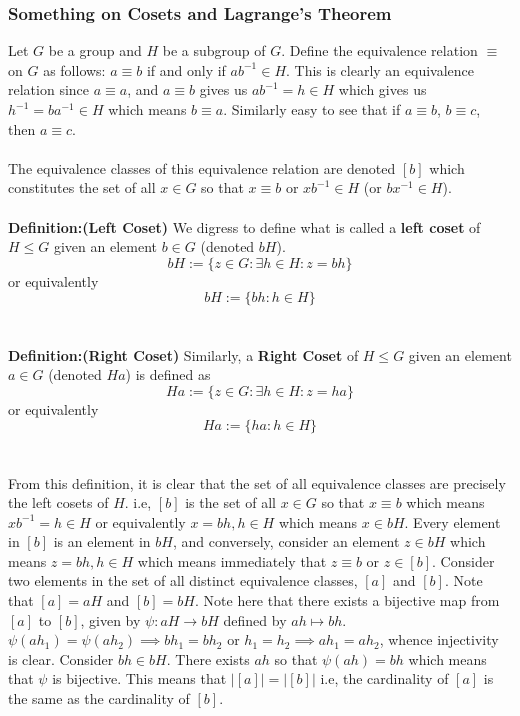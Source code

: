 \documentclass[../Main.tex]{subfiles}
\begin{document}

\subsubsection{Something on Cosets and Lagrange's Theorem}
Let $G$ be a group and $H$ be a subgroup of $G$. Define the equivalence relation $\equiv$ on $G$ as follows: $a \equiv b$ if and only if $ab^{-1} \in H$. This is clearly an equivalence relation since $a\equiv a$, and $a\equiv b$ gives us $ab^{-1}=h \in H$ which gives us $h^{-1}=ba^{-1}\in H$ which means $b\equiv a$. Similarly easy to see that if $a\equiv b$, $b\equiv c$, then $a\equiv c$. 
\\\\ The equivalence classes of this equivalence relation are denoted $[b]$ which constitutes the set of all $x \in G$ so that $x\equiv b$ or $xb^{-1}\in H$ (or $bx^{-1} \in H$). 
\\\\ \textbf{Definition:(Left Coset)} We digress to define what is called a \textbf{left coset} of $H\leq G$ given an element $b \in G$ (denoted $bH$). $$bH:=\{z\in G: \exists h \in H: z=bh\}$$ or equivalently $$bH:=\{bh:h\in H\}$$
\\\\ \textbf{Definition:(Right Coset)} Similarly, a \textbf{Right Coset} of $H \leq G$ given an element $a \in G$ (denoted $Ha$) is defined as $$Ha:=\{z \in G: \exists h \in H: z=ha\} $$ or equivalently $$Ha:=\{ha: h \in H\} $$
\\\\From this definition, it is clear that the set of all equivalence classes are precisely the left cosets of $H$. i.e, $[b]$ is the set of all $x \in G$ so that $x \equiv b$ which means $xb^{-1}=h\in H$ or equivalently $x=bh, h\in H$ which means $x \in bH$. Every element in $[b]$ is an element in $bH$, and conversely, consider an element $z \in bH$ which means $z=bh, h \in H$ which means immediately that $z \equiv b$ or $z \in [b]$. Consider two elements in the set of all distinct equivalence classes, $[a]$ and $[b]$. Note that $[a]=aH$ and $[b]=bH$. Note here that there exists a bijective map from $[a]$ to $[b]$, given by $\psi:aH \to bH$ defined by $ah \mapsto bh$. $\psi(ah_1)=\psi(ah_2) \implies bh_1=bh_2$ or $h_1=h_2 \implies ah_1=ah_2$, whence injectivity is clear. Consider $bh \in bH$. There exists $ah$ so that $\psi(ah)=bh$ which means that $\psi$ is bijective. This means that $|[a]|=|[b]|$ i.e, the cardinality of $[a]$ is the same as the cardinality of $[b]$.
\end{document}

